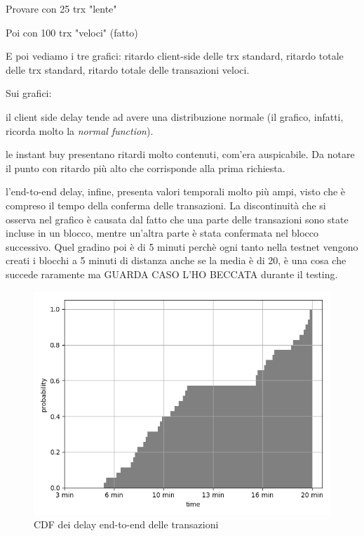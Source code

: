 Provare con 25 trx "lente"

Poi con 100 trx "veloci" (fatto)

E poi vediamo i tre grafici: ritardo client-side delle trx standard, ritardo totale delle trx standard, ritardo totale delle transazioni veloci.

Sui grafici: 

il client side delay tende ad avere una distribuzione normale (il grafico, infatti, ricorda molto la \textit{normal function}). 

le instant buy presentano ritardi molto contenuti, com'era auspicabile. Da notare il punto con ritardo più alto che corrisponde alla prima richiesta.

l'end-to-end delay, infine, presenta valori temporali molto più ampi, visto che è compreso il tempo della conferma delle transazioni. La discontinuità che si osserva nel grafico è causata dal fatto che una parte delle transazioni sono state incluse in un blocco, mentre un'altra parte è stata confermata nel blocco successivo. Quel gradino poi è di 5 minuti perchè ogni tanto nella testnet vengono creati i blocchi a 5 minuti di distanza anche se la media è di 20, è una cosa che succede raramente ma GUARDA CASO L'HO BECCATA durante il testing.

\begin{figure}[h!t]
\centerline{\includegraphics[width=\textwidth]{img/end-to-endGIUSTO}}
\caption{CDF dei delay end-to-end delle transazioni}
\label{f:calcoli:end2end}
\end{figure}

